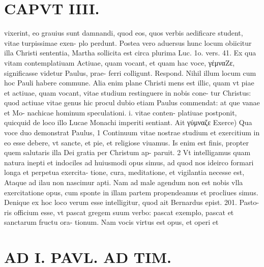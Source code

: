 \documentclass{article}
\begin{document}
\begin{pages}
\section*{CAPVT  IIII. }
\marginpar{[ p.205 ]}\pstart vixerint, eo grauius sunt damnandi, quod eos, quos verbis aedificare student, vitae turpissimae exen- plo perdunt. Postea vero aduersus hunc locum obiicitur illa Christi sententia, Martha sollicita est circa plurima Luc. 1o. vers. 41. Ex qua vitam contemplatiuam Actiuae, quam vocant, et quam hac voce, γέμναZε, significasse videtur Paulus, prae- ferri colligunt. Respond. Nihil illum locum cum hoc Pauli habere commune. Alia enim plane Christi mens est illic, quam vt piae et actiuae, quam vocant, vitae studium restinguere in nobis cone- tur Christus: quod actiuae vitae genus hic procul dubio etiam Paulus commendat: at que vanae et Mo- nachicae hominum speculationi. i. vitae conten- platiuae postponit, quicquid de loco illo Lucae Monachi imperiti sentiant. Ait γύμναζε Exerce) Qua voce duo demonstrat Paulus, 1 Continuum vitae nostrae studium et exercitium in eo esse debere, vt sancte, et pie, et religiose viuamus. Is enim est finis, propter quem salutaris illa Dei gratia per Christum ap- paruit. 2 Vt intelligamus quam natura inepti et indociles ad huiusmodi opus simus, ad quod nos ideirco formari longa et perpetua exercita- tione, cura, meditatione, et vigilantia necesse est, Ataque ad ilau non nascimur apti. Nam ad male agendum non est nobis vlla exercitatione opus, cum sponte in illam partem propendeamus et procliues simus. Denique ex hoc loco verum esse intelligitur, quod ait Bernardus epist. 201. Pasto- ris officium esse, vt pascat gregem suum verbo: pascat exemplo, pascat et sanctarum fructu ora- tionum. Nam vocis virtus est opus, et operi et  \pend
\section*{AD I. PAVL. AD TIM. }
\marginpar{[ p.206 ]}\pstart {}
{}

\end{pages}
\end{document}
